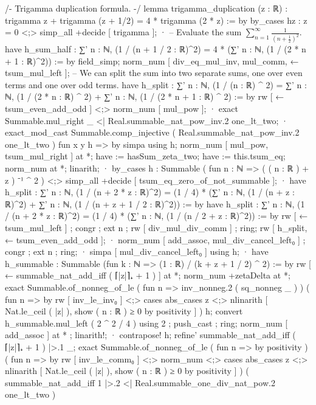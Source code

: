 {/-
Trigamma duplication formula.
-/
lemma trigamma_duplication (z : ℝ) : trigamma z + trigamma (z + 1/2) = 4 * trigamma (2 * z) := by
  by_cases hz : z = 0 <;> simp_all +decide [ trigamma ];
  · -- Evaluate the sum $\sum_{n=1}^{\infty} \frac{1}{(n + \frac{1}{2})^2}$.
    have h_sum_half : ∑' n : ℕ, (1 / (n + 1 / 2 : ℝ)^2) = 4 * (∑' n : ℕ, (1 / (2 * n + 1 : ℝ)^2)) := by
      field_simp;
      norm_num [ div_eq_mul_inv, mul_comm, ← tsum_mul_left ];
    -- We can split the sum into two separate sums, one over even terms and one over odd terms.
    have h_split : ∑' n : ℕ, (1 / (n : ℝ) ^ 2) = ∑' n : ℕ, (1 / (2 * n : ℝ) ^ 2) + ∑' n : ℕ, (1 / (2 * n + 1 : ℝ) ^ 2) := by
      rw [ ← tsum_even_add_odd ] <;> norm_num [ mul_pow ];
      · exact Summable.mul_right _ <| Real.summable_nat_pow_inv.2 one_lt_two;
      · exact_mod_cast Summable.comp_injective ( Real.summable_nat_pow_inv.2 one_lt_two ) fun x y h => by simpa using h;
    norm_num [ mul_pow, tsum_mul_right ] at *; have := hasSum_zeta_two; have := this.tsum_eq; norm_num at *; linarith;
  · by_cases h : Summable ( fun n : ℕ => ( ( n : ℝ ) + z ) ⁻¹ ^ 2 ) <;> simp_all +decide [ tsum_eq_zero_of_not_summable ];
    · have h_split : ∑' n : ℕ, (1 / (n + 2 * z : ℝ)^2) = (1 / 4) * (∑' n : ℕ, (1 / (n + z : ℝ)^2) + ∑' n : ℕ, (1 / (n + z + 1 / 2 : ℝ)^2)) := by
        have h_split : ∑' n : ℕ, (1 / (n + 2 * z : ℝ)^2) = (1 / 4) * (∑' n : ℕ, (1 / (n / 2 + z : ℝ)^2)) := by
          rw [ ← tsum_mul_left ] ; congr ; ext n ; rw [ div_mul_div_comm ] ; ring;
        rw [ h_split, ← tsum_even_add_odd ];
        · norm_num [ add_assoc, mul_div_cancel_left₀ ] ; congr ; ext n ; ring;
        · simpa [ mul_div_cancel_left₀ ] using h;
        · have h_summable : Summable (fun k : ℕ => (1 : ℝ) / (k + z + 1 / 2) ^ 2) := by
            rw [ ← summable_nat_add_iff ( ⌈|z|⌉₊ + 1 ) ] at *;
            norm_num +zetaDelta at *;
            exact Summable.of_nonneg_of_le ( fun n => inv_nonneg.2 ( sq_nonneg _ ) ) ( fun n => by rw [ inv_le_inv₀ ] <;> cases abs_cases z <;> nlinarith [ Nat.le_ceil ( |z| ), show ( n : ℝ ) ≥ 0 by positivity ] ) h;
          convert h_summable.mul_left ( 2 ^ 2 / 4 ) using 2 ; push_cast ; ring;
      norm_num [ add_assoc ] at * ; linarith!;
    · contrapose! h;
      refine' summable_nat_add_iff ( ⌈|z|⌉₊ + 1 ) |>.1 _;
      exact Summable.of_nonneg_of_le ( fun n => by positivity ) ( fun n => by rw [ inv_le_comm₀ ] <;> norm_num <;> cases abs_cases z <;> nlinarith [ Nat.le_ceil ( |z| ), show ( n : ℝ ) ≥ 0 by positivity ] ) ( summable_nat_add_iff 1 |>.2 <| Real.summable_one_div_nat_pow.2 one_lt_two )

}
